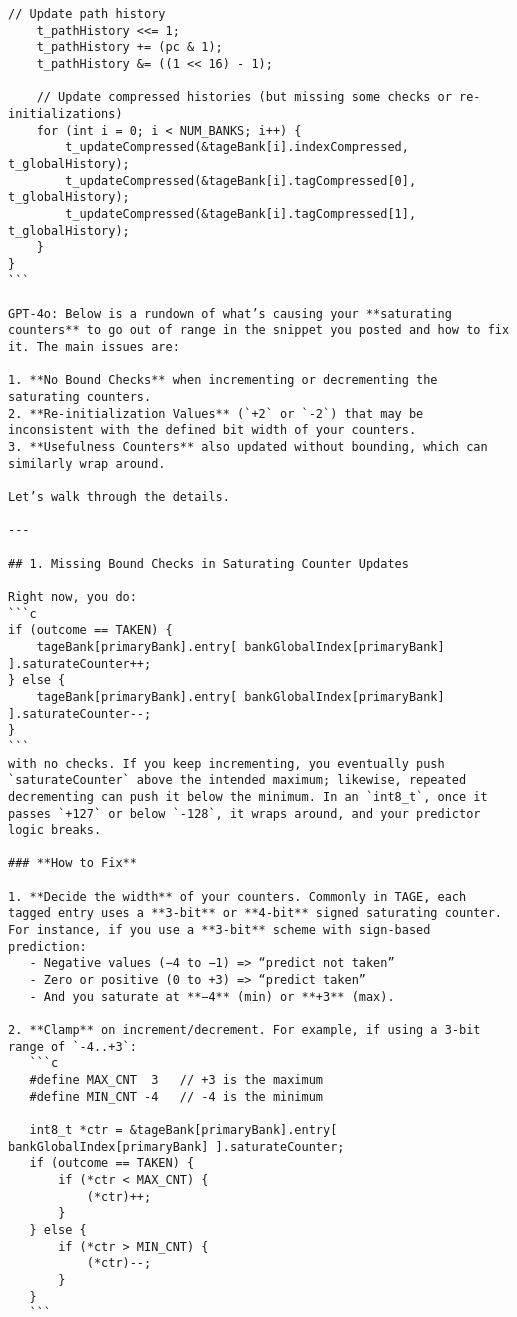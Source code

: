 \documentclass[11pt]{article}
\begin{document}
\begin{Verbatim}[fontsize=\tiny, breaklines=true]
    // Update path history
    t_pathHistory <<= 1;
    t_pathHistory += (pc & 1);
    t_pathHistory &= ((1 << 16) - 1);

    // Update compressed histories (but missing some checks or re-initializations)
    for (int i = 0; i < NUM_BANKS; i++) {
        t_updateCompressed(&tageBank[i].indexCompressed, t_globalHistory);
        t_updateCompressed(&tageBank[i].tagCompressed[0], t_globalHistory);
        t_updateCompressed(&tageBank[i].tagCompressed[1], t_globalHistory);
    }
}
```

GPT-4o: Below is a rundown of what’s causing your **saturating counters** to go out of range in the snippet you posted and how to fix it. The main issues are:

1. **No Bound Checks** when incrementing or decrementing the saturating counters.
2. **Re-initialization Values** (`+2` or `-2`) that may be inconsistent with the defined bit width of your counters.
3. **Usefulness Counters** also updated without bounding, which can similarly wrap around.

Let’s walk through the details.

---

## 1. Missing Bound Checks in Saturating Counter Updates

Right now, you do:
```c
if (outcome == TAKEN) {
    tageBank[primaryBank].entry[ bankGlobalIndex[primaryBank] ].saturateCounter++;
} else {
    tageBank[primaryBank].entry[ bankGlobalIndex[primaryBank] ].saturateCounter--;
}
```
with no checks. If you keep incrementing, you eventually push `saturateCounter` above the intended maximum; likewise, repeated decrementing can push it below the minimum. In an `int8_t`, once it passes `+127` or below `-128`, it wraps around, and your predictor logic breaks.

### **How to Fix**

1. **Decide the width** of your counters. Commonly in TAGE, each tagged entry uses a **3-bit** or **4-bit** signed saturating counter. For instance, if you use a **3-bit** scheme with sign-based prediction:
   - Negative values (−4 to −1) => “predict not taken”
   - Zero or positive (0 to +3) => “predict taken”
   - And you saturate at **−4** (min) or **+3** (max).

2. **Clamp** on increment/decrement. For example, if using a 3-bit range of `-4..+3`:
   ```c
   #define MAX_CNT  3   // +3 is the maximum
   #define MIN_CNT -4   // -4 is the minimum

   int8_t *ctr = &tageBank[primaryBank].entry[ bankGlobalIndex[primaryBank] ].saturateCounter;
   if (outcome == TAKEN) {
       if (*ctr < MAX_CNT) {
           (*ctr)++;
       }
   } else {
       if (*ctr > MIN_CNT) {
           (*ctr)--;
       }
   }
   ```


\end{Verbatim}
\end{document}
